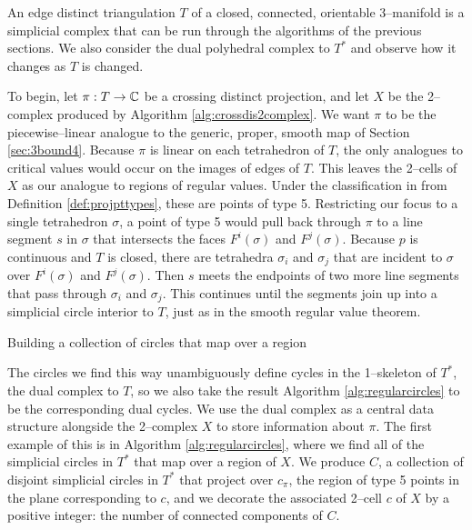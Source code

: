 An edge distinct triangulation $T$ of a closed, connected, orientable 3--manifold is a simplicial complex that can be run through the algorithms of the previous sections.
We also consider the dual polyhedral complex to $T^*$ and observe how it changes as $T$ is changed.

To begin, let $\pi:T\to\mathbb{C}$ be a crossing distinct projection, and let $X$ be the 2--complex produced by Algorithm \ref{alg:crossdis2complex}.
We want $\pi$ to be the piecewise--linear analogue to the generic, proper, smooth map of Section \ref{sec:3bound4}.
Because $\pi$ is linear on each tetrahedron of $T$, the only analogues to critical values would occur on the images of edges of $T$.
This leaves the 2--cells of $X$ as our analogue to regions of regular values.
Under the classification in from Definition \ref{def:projpttypes}, these are points of type 5.
Restricting our focus to a single tetrahedron $\sigma$, a point of type 5 would pull back through $\pi$ to a line segment $s$ in $\sigma$ that intersects the faces $F^i(\sigma)$ and $F^j(\sigma)$.
Because $p$ is continuous and $T$ is closed, there are tetrahedra $\sigma_i$ and $\sigma_j$ that are incident to $\sigma$ over $F^i(\sigma)$ and $F^j(\sigma)$.
Then $s$ meets the endpoints of two more line segments that pass through $\sigma_i$ and $\sigma_j$.
This continues until the segments join up into a simplicial circle interior to $T$, just as in the smooth regular value theorem.

\begin{algorithm}[h]
	\caption{Building a collection of circles that map over a region}
	\label{alg:regularcircles}
\end{algorithm}

The circles we find this way unambiguously define cycles in the 1--skeleton of $T^*$, the dual complex to $T$, so we also take the result Algorithm \ref{alg:regularcircles} to be the corresponding dual cycles.
We use the dual complex as a central data structure alongside the 2--complex $X$ to store information about $\pi$.
The first example of this is in Algorithm \ref{alg:regularcircles}, where we find all of the simplicial circles in $T^*$ that map over a region of $X$.
We produce $C$, a collection of disjoint simplicial circles in $T^*$ that project over $c_\pi$, the region of type 5 points in the plane corresponding to $c$, and we decorate the associated 2--cell $c$ of $X$ by a positive integer: the number of connected components of $C$.

